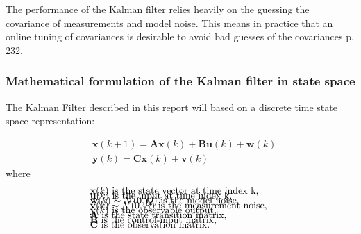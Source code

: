 The performance of the Kalman filter relies heavily on the guessing the covariance of measurements and model noise. This means in practice that an online tuning of covariances is desirable to avoid bad guesses of the covariances \cite{Doraiswami2014} p. 232.

\subsubsection{Mathematical formulation of the Kalman filter in state space}
The Kalman Filter described in this report will based on a discrete time state space representation: 

\begin{align}
	&\textbf{x}(k+1) = \textbf{A}\textbf{x}(k) + \textbf{B}\textbf{u}(k) + \textbf{w}(k)  \label{eq:KalmanSystemEquations} \\
	&\textbf{y}(k) = \textbf{C}\textbf{x}(k)+\textbf{v}(k) 
\end{align}
where 
\begin{align*}
	&\text{$\textbf{x}(k)$ is the state vector at time index k,					}	\\[-1em]
	&\text{$\textbf{u}(k)$ is the input at time index k, 						}	\\[-1em]
	&\text{$\textbf{w}(k) \sim \mathcal{N}(0, Q)$ is the model noise,			}	\\[-1em]
	&\text{$\textbf{v}(k) \sim \mathcal{N}(0, R)$ is the measurement noise,		}	\\[-1em]
	&\text{$\textbf{y}(k)$ is the observable output, 							}	\\[-1em]
	&\text{\textbf{A} is the state transition matrix,							}	\\[-1em]
	&\text{\textbf{B} is the control-input matrix,								}	\\[-1em]
	&\text{\textbf{C} is the observation matrix. 								}	\\[-1em]
\end{align*}


